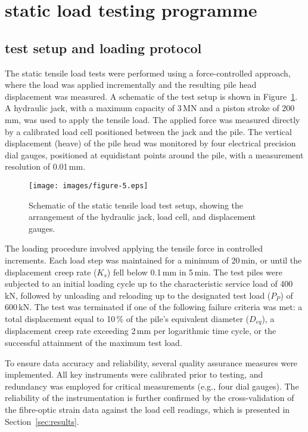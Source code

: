 {{{{\section{static load testing programme}
\label{subsec:Static_pile_load_testing}

\subsection{test setup and loading protocol}

The static tensile load tests were performed using a force-controlled approach, where the load was applied incrementally and the resulting pile head displacement was measured. A schematic of the test setup is shown in Figure~\ref{fig:Sensoranordnung_PB}. A hydraulic jack, with a maximum capacity of 3\,MN and a piston stroke of 200\,mm, was used to apply the tensile load. The applied force was measured directly by a calibrated load cell positioned between the jack and the pile. The vertical displacement (heave) of the pile head was monitored by four electrical precision dial gauges, positioned at equidistant points around the pile, with a measurement resolution of 0.01\,mm.

\begin{figure}[!htb]
	\begin{center}
		{\texttt{[image: images/figure-5.eps]}}
		\caption{Schematic of the static tensile load test setup, showing the arrangement of the hydraulic jack, load cell, and displacement gauges.}
		\label{fig:Sensoranordnung_PB}
	\end{center}
\end{figure}


The loading procedure involved applying the tensile force in controlled increments. Each load step was maintained for a minimum of 20\,min, or until the displacement creep rate ($K_s$) fell below 0.1\,mm in 5\,min. The test piles were subjected to an initial loading cycle up to the characteristic service load of 400\,kN, followed by unloading and reloading up to the designated test load ($P_P$) of 600\,kN. The test was terminated if one of the following failure criteria was met: a total displacement equal to 10\,\% of the pile's equivalent diameter ($D_{eq}$), a displacement creep rate exceeding 2\,mm per logarithmic time cycle, or the successful attainment of the maximum test load.

To ensure data accuracy and reliability, several quality assurance measures were implemented. All key instruments were calibrated prior to testing, and redundancy was employed for critical measurements (e.g., four dial gauges). The reliability of the instrumentation is further confirmed by the cross-validation of the fibre-optic strain data against the load cell readings, which is presented in Section~\ref{sec:results}.




}}}}
